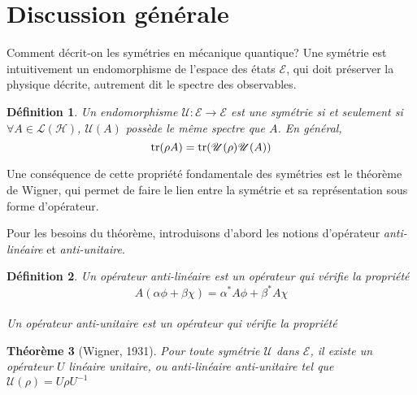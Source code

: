 \documentclass[11pt,twoside,a4paper]{report}
\numberwithin{equation}{part}
\newtheorem{theorem}{Théorème}[section]
\newtheorem{definition}[theorem]{Définition}
\begin{document}

\section{Discussion générale}

Comment décrit-on les symétries en mécanique quantique? Une symétrie est intuitivement un endomorphisme de l'espace des états $\mathcal{E}$, qui doit préserver la physique décrite, autrement dit le spectre des observables.

\begin{definition}
Un endomorphisme $\mathcal{U}:\mathcal{E} \to \mathcal{E}$ est une \emph{symétrie} si et seulement si $\forall A \in \mathcal{L}(\mathcal{H})$, $\mathcal{U}(A)$ possède le même spectre que $A$. En général,
$$ \tr(\rho A) = \tr(\mathcal{U}(\rho)\mathcal{U}(A)) $$
\end{definition}

Une conséquence de cette propriété fondamentale des symétries est le théorème de Wigner, qui permet de faire le lien entre la symétrie et sa représentation sous forme d'opérateur.

Pour les besoins du théorème, introduisons d'abord les notions d'opérateur \emph{anti-linéaire} et \emph{anti-unitaire}.

\begin{definition}
  Un opérateur \emph{anti-linéaire} est un opérateur qui vérifie la propriété
  $$ A(\alpha\phi + \beta\chi) = \alpha^* A\phi + \beta^* A\chi $$ \\
  Un opérateur \emph{anti-unitaire} est un opérateur qui vérifie la propriété
\end{definition}

\begin{theorem}[Wigner, 1931]
Pour toute symétrie $\mathcal{U}$ dans $\mathcal{E}$, il existe un opérateur $U$ linéaire unitaire, ou anti-linéaire anti-unitaire tel que $\mathcal{U}(\rho) = U\rho U^{-1}$
\end{theorem}
\end{document}
